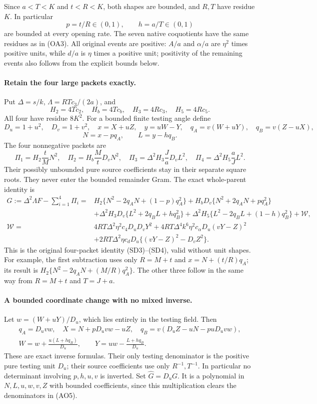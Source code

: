 Since $a<T<K$ and $t<R<K$, both shapes are bounded, and $R,T$ have
residue $K$. In particular
\[
       p=t/R\in(0,1),\qquad h=a/T\in(0,1)              \tag{AO2}
\]
are bounded at every opening rate. The seven native coquotients have
the same residues as in (OA3). All original events are positive:
$A/a$ and $\alpha/a$ are $\eta^2$ times positive units, while
$d/a$ is $\eta$ times a positive unit; positivity of the remaining
events also follows from the explicit bounds below.

\paragraph{Retain the four large packets exactly.}
Put $\Delta=s/k$, $\Lambda=RTc_3/(2a)$, and
\[
 H_2=4Tc_2,\quad H_b=4Tc_b,\quad H_3=4Rc_3,\quad H_5=4Rc_5.
\]
All four have residue $8K^2$. For a bounded finite testing angle define
\[
 D_u=1+u^2,\quad D_v=1+v^2,\quad
 x=X+uZ,\quad y=uW-Y,\quad
 q_A=v(W+uY),\quad q_B=v(Z-uX),
\]
\[
                    N=x-pq_A,\qquad L=y-hq_B.
\]
The four nonnegative packets are
\[
 \Pi_1=H_2\frac tM N^2,\quad
 \Pi_2=H_b\frac MtD_vN^2,\quad
 \Pi_3=\Delta^2H_3\frac JaD_vL^2,\quad
 \Pi_4=\Delta^2H_5\frac aJL^2.                         \tag{AO3}
\]
Their possibly unbounded pure source coefficients stay in their
separate square roots. They never enter the bounded remainder Gram.
The exact whole-parent identity is
\begin{align*}
 G:=\Delta^2\Lambda F-\sum_{i=1}^4\Pi_i
 ={}&H_2\{N^2-2q_AN+(1-p)q_A^2\}
     +H_bD_v\{N^2+2q_AN+pq_A^2\}\\
 &+\Delta^2H_3D_v\{L^2+2q_BL+hq_B^2\}
     +\Delta^2H_5\{L^2-2q_BL+(1-h)q_B^2\}
     +\mathcal W,                                      \tag{AO4}\\
 \mathcal W={}&4RT\Delta^2\eta^2c_4D_uD_vY^2
   +4RT\Delta^4k^6\eta^2c_\alpha D_u(vY-Z)^2\\
 &+2RT\Delta^2\eta c_dD_u\{(vY-Z)^2-D_vZ^2\}.
\end{align*}
This is the original four-packet identity (SD3)--(SD4), valid without
unit shapes. For example, the first subtraction uses only
$R=M+t$ and $x=N+(t/R)q_A$; its result is
$H_2\{N^2-2q_AN+(M/R)q_A^2\}$. The other three follow in the
same way from $R=M+t$ and $T=J+a$.

\paragraph{A bounded coordinate change with no mixed inverse.}
Let $w=(W+uY)/D_u$, which lies entirely in the testing field. Then
\[
\begin{gathered}
 q_A=D_uv w,\quad
 X=N+pD_uv w-uZ,\quad
 q_B=v(D_uZ-uN-puD_uv w),\\
 W=w+\frac{u(L+hq_B)}{D_u},\qquad
 Y=uw-\frac{L+hq_B}{D_u}.                             
\end{gathered}
\tag{AO5}
\]
These are exact inverse formulas. Their only testing denominator is
the positive pure testing unit $D_u$; their source coefficients use
only $R^{-1},T^{-1}$. In particular no determinant involving $p,h,u,v$
is inverted. Set $\widehat G=D_uG$. It is a polynomial in
$N,L,u,w,v,Z$ with bounded coefficients, since this multiplication
clears the denominators in (AO5).

